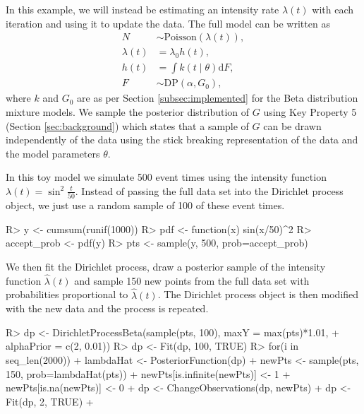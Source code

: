 \documentclass[nojss]{jss}
\begin{document}
In this example, we will instead be estimating an intensity rate $\lambda (t)$ with each iteration and using it to update the data. The full model can be written as
\begin{align*}
N & \sim \text{Poisson} ( \lambda (t) ), \\
\lambda (t) & = \lambda _0 h(t), \\
h (t) & = \int k(t \mid \theta) \mathrm{d}F, \\
F & \sim \text{DP} (\alpha , G_0),
\end{align*}
where $k$ and $G_0$ are as per Section \ref{subsec:implemented} for the Beta distribution mixture models. We sample the posterior distribution of $G$ using Key Property 5 (Section \ref{sec:background}) which states that a sample of $G$ can be drawn independently of the data using the stick breaking representation of the data and the model parameters $\theta$.

In this toy model we simulate 500 event times using the intensity function $\lambda (t) = \sin ^2 \frac{t}{50}$. Instead of passing the full data set into the Dirichlet process object, we just use a random sample of 100 of these event times.

\begin{Schunk}
\begin{Sinput}
R> y <- cumsum(runif(1000))
R> pdf <- function(x) sin(x/50)^2
R> accept_prob <- pdf(y)
R> pts <- sample(y, 500, prob=accept_prob)
\end{Sinput}
\end{Schunk}

We then fit the Dirichlet process, draw a posterior sample of the intensity function $\hat{\lambda} (t)$ and sample 150 new points from the full data set with probabilities proportional to $\hat{\lambda} (t)$. The Dirichlet process object is then modified with the new data and the process is repeated.

\begin{Schunk}
\begin{Sinput}
R> dp <- DirichletProcessBeta(sample(pts, 100), maxY = max(pts)*1.01,
+  alphaPrior = c(2, 0.01))
R> dp <- Fit(dp, 100, TRUE)
R> for(i in seq_len(2000)){
+    lambdaHat <- PosteriorFunction(dp)
+    newPts <- sample(pts, 150, prob=lambdaHat(pts))
+    newPts[is.infinite(newPts)] <- 1
+    newPts[is.na(newPts)] <- 0
+    dp <- ChangeObservations(dp, newPts)
+    dp <- Fit(dp, 2, TRUE)
+  }
\end{Sinput}
\end{Schunk}
\end{document}

